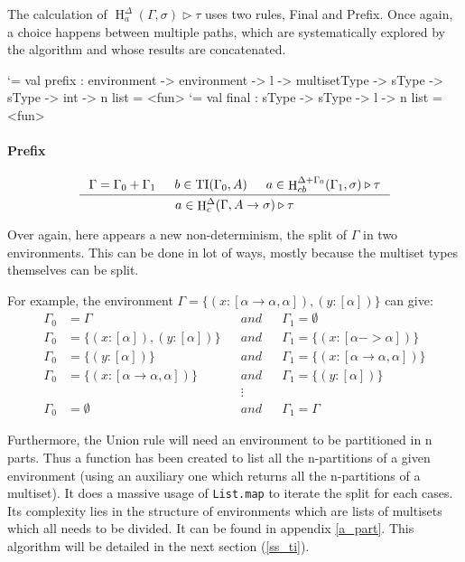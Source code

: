 \documentclass{article}
\let\origlstlisting=\lstlisting
\let\endoriglstlisting=\endlstlisting
\renewenvironment{lstlisting}
{\mathcode`\-=\hyphenmathcode
    \everymath{}\mathsurround=0pt\origlstlisting}
{\endoriglstlisting}
\DeclareMathOperator{\iH}{H}
\DeclareMathOperator{\iTI}{TI}
\begin{document}
The calculation of $\iH^\Delta_a(\Gamma, \sigma) \triangleright \tau$ uses two rules, Final and Prefix. Once again, a choice happens between multiple paths, which are systematically explored by the algorithm and whose results are concatenated. 

\begin{lstlisting}[frame=single]
val prefix : environment -> environment -> l
-> multisetType -> sType -> sType -> int -> n list = <fun>
\end{lstlisting}
\begin{lstlisting}[frame=single]
val final : sType -> sType -> l -> n list = <fun>
\end{lstlisting}

\paragraph{Prefix}
\begin{displaymath}
\inference[]{\Gamma = \Gamma_0 + \Gamma_1 & b \in \iTI(\Gamma_0, A) & a \in \iH^{\Delta + \Gamma_0}_{cb}(\Gamma_1, \sigma) \triangleright \tau}{a \in \iH^{\Delta}_c(\Gamma, A \rightarrow \sigma) \triangleright \tau}
\end{displaymath}

Over again, here appears a new non-determinism, the split of $\Gamma$ in two environments. This can be done in lot of ways, mostly because the multiset types themselves can be split.

For example, the environment $\Gamma = \{(x : [\alpha \rightarrow \alpha, \alpha]), (y : [\alpha])\}$ can give:
\begin{align*}
   \Gamma_0 &= \Gamma &&and&& \Gamma_1 = \emptyset
   \\\Gamma_0 &= \{(x:[\alpha]), (y:[\alpha])\} &&and&& \Gamma_1 = \{(x:[\alpha -> \alpha])\}
   \\\Gamma_0 &= \{(y:[\alpha])\} &&and&& \Gamma_1 = \{(x : [\alpha \rightarrow \alpha, \alpha])\}
   \\\Gamma_0 &= \{(x : [\alpha \rightarrow \alpha, \alpha])\} &&and&& \Gamma_1 = \{(y:[\alpha])\}
   \\&&&\vdots&&
   \\\Gamma_0 &= \emptyset &&and&& \Gamma_1 = \Gamma
\end{align*}

Furthermore, the Union rule will need an environment to be partitioned in n parts. Thus a function has been created to list all the n-partitions of a given environment (using an auxiliary one which returns all the n-partitions of a multiset). It does a massive usage of \texttt{List.map} to iterate the split for each cases. Its complexity lies in the structure of environments which are lists of multisets which all needs to be divided. It can be found in appendix \ref{a_part}. This algorithm will be detailed in the next section (\ref{ss_ti}).
\end{document}
